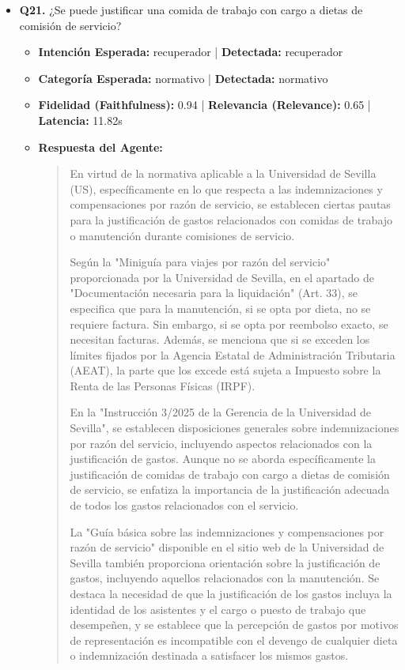 \documentclass[12pt,a4paper,oneside]{report}
\begin{document}
\begin{itemize}
  
\item \textbf{Q21.} ¿Se puede justificar una comida de trabajo con cargo a dietas de comisión de servicio? \\
        \begin{itemize}
          \item \textbf{Intención Esperada:} recuperador | \textbf{Detectada:} recuperador
          \item \textbf{Categoría Esperada:} normativo | \textbf{Detectada:} normativo
          \item \textbf{Fidelidad (Faithfulness):} 0.94 | \textbf{Relevancia (Relevance):} 0.65 | \textbf{Latencia:} 11.82s
          \item \textbf{{Respuesta del Agente:}} \\
                \begin{quote}
En virtud de la normativa aplicable a la Universidad de Sevilla (US), específicamente en lo que respecta a las indemnizaciones y compensaciones por razón de servicio, se establecen ciertas pautas para la justificación de gastos relacionados con comidas de trabajo o manutención durante comisiones de servicio.

Según la "Miniguía para viajes por razón del servicio" proporcionada por la Universidad de Sevilla, en el apartado de "Documentación necesaria para la liquidación" (Art. 33), se especifica que para la manutención, si se opta por dieta, no se requiere factura. Sin embargo, si se opta por reembolso exacto, se necesitan facturas. Además, se menciona que si se exceden los límites fijados por la Agencia Estatal de Administración Tributaria (AEAT), la parte que los excede está sujeta a Impuesto sobre la Renta de las Personas Físicas (IRPF).

En la "Instrucción 3/2025 de la Gerencia de la Universidad de Sevilla", se establecen disposiciones generales sobre indemnizaciones por razón del servicio, incluyendo aspectos relacionados con la justificación de gastos. Aunque no se aborda específicamente la justificación de comidas de trabajo con cargo a dietas de comisión de servicio, se enfatiza la importancia de la justificación adecuada de todos los gastos relacionados con el servicio.

La "Guía básica sobre las indemnizaciones y compensaciones por razón de servicio" disponible en el sitio web de la Universidad de Sevilla también proporciona orientación sobre la justificación de gastos, incluyendo aquellos relacionados con la manutención. Se destaca la necesidad de que la justificación de los gastos incluya la identidad de los asistentes y el cargo o puesto de trabajo que desempeñen, y se establece que la percepción de gastos por motivos de representación es incompatible con el devengo de cualquier dieta o indemnización destinada a satisfacer los mismos gastos.


\end{quote}
\end{itemize}
\end{itemize}
\end{document}
